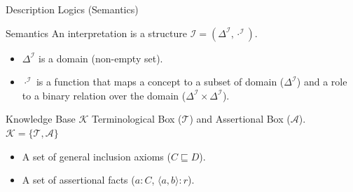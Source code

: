 \documentclass{beamer}
\begin{document}
\begin{frame}{Description Logics (Semantics)}
	\begin{block}{Semantics}
 An interpretation is a structure $\mathcal{I}=(\Delta^\mathcal{I},\cdot^\mathcal{I})$.
 \begin{itemize}
  \item $\Delta^\mathcal{I}$ is a domain (non-empty set).
   \item $\cdot^\mathcal{I}$ is a function that maps a concept to a subset of domain ($\Delta^\mathcal{I}$) and a role to a binary relation over the domain ($\Delta^\mathcal{I}\times \Delta^\mathcal{I}$).
 \end{itemize}
\end{block}

\begin{block}{Knowledge Base $\mathcal{K}$}
Terminological Box ($\mathcal{T}$) and Assertional Box ($\mathcal{A}$).
$\mathcal{K}=\{\mathcal{T},\mathcal{A}\}$
\begin{itemize}
 \item A set of general inclusion axioms ($C\sqsubseteq D$).
 \item A set of assertional facts ($a:C$, $\langle a,b\rangle: r$).
\end{itemize}

\end{block}
\end{frame}
\end{document}
